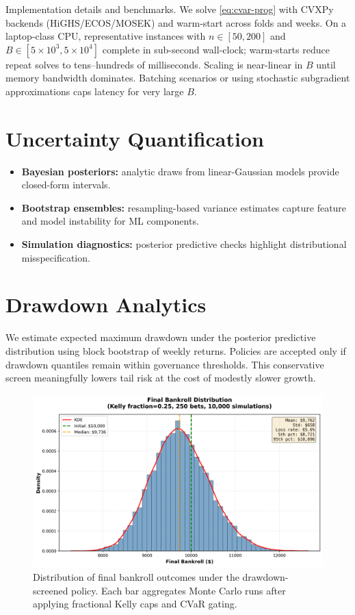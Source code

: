 Implementation details and benchmarks. We solve \eqref{eq:cvar-prog} with CVXPy backends (HiGHS/ECOS/MOSEK) and warm-start across folds and weeks. On a laptop-class CPU, representative instances with $n\in[50,200]$ and $B\in[5\times10^3,5\times10^4]$ complete in sub-second wall-clock; warm-starts reduce repeat solves to tens–hundreds of milliseconds. Scaling is near-linear in $B$ until memory bandwidth dominates. Batching scenarios or using stochastic subgradient approximations caps latency for very large $B$.

\section{Uncertainty Quantification}
\begin{itemize}
  \item \textbf{Bayesian posteriors:} analytic draws from linear-Gaussian models provide closed-form intervals.
  \item \textbf{Bootstrap ensembles:} resampling-based variance estimates capture feature and model instability for ML components.
  \item \textbf{Simulation diagnostics:} posterior predictive checks highlight distributional misspecification.
\end{itemize}

\section{Drawdown Analytics}\label{sec:drawdown}
We estimate expected maximum drawdown under the posterior predictive distribution using block bootstrap of weekly returns. Policies are accepted only if drawdown quantiles remain within governance thresholds. This conservative screen meaningfully lowers tail risk at the cost of modestly slower growth.

\begin{figure}[t]
  \centering
  \includegraphics[width=0.9\linewidth]{../figures/bankroll_hist.png}
  \caption[Final bankroll distribution]{Distribution of final bankroll outcomes under the drawdown-screened policy. Each bar aggregates Monte Carlo runs after applying fractional Kelly caps and CVaR gating.}
  \label{fig:bankroll-hist}
\end{figure}


